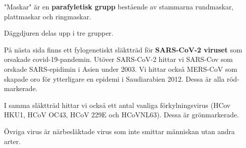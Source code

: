 \documentclass{exam}
\begin{document}
\begin{questions}
\break
\vspace{5mm}
\question "Maskar" är en \textbf{parafyletisk grupp} bestående av stammarna rundmaskar, plattmaskar och ringmaskar.
\vspace{100mm}
\question Däggdjuren delas upp i tre grupper.
\break
\vspace{5mm} %
\question På nästa sida finns ett fylogenetiskt släktträd för \textbf{SARS-CoV-2 viruset} som orsakade covid-19-pandemin. Utöver SARS-CoV-2 hittar vi SARS-Cov som orskade SARS-epidimin i Asien under 2003. Vi hittar också MERS-CoV som skapade oro för ytterligare en epidemi i Saudiarabien 2012. Dessa är alla röd-markerade.

I samma släktträd hittar vi också ett antal vanliga förkylningsvirus (HCov HKU1, HCoV OC43, HCoV 229E och HCoVNL63). Dessa är grönmarkerade.

Övriga virus är närbesläktade virus som inte smittar människan utan andra arter.
\vspace{5mm} 
\end{questions}
\end{document}

